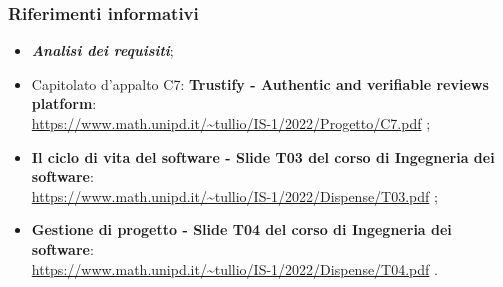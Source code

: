 \subsubsection{Riferimenti informativi}
\begin{itemize}
    \item \textbf{\textit{Analisi dei requisiti}};
    \item Capitolato d'appalto C7: \textbf{Trustify - Authentic and verifiable reviews platform}: \\
          \url{https://www.math.unipd.it/~tullio/IS-1/2022/Progetto/C7.pdf} \hfill{};
    \item \textbf{Il ciclo di vita del software - Slide T03 del corso di Ingegneria dei software}: \\
          \url{https://www.math.unipd.it/~tullio/IS-1/2022/Dispense/T03.pdf} \hfill{};
    \item \textbf{Gestione di progetto - Slide T04 del corso di Ingegneria dei software}: \\
          \url{https://www.math.unipd.it/~tullio/IS-1/2022/Dispense/T04.pdf} \hfill{}.
\end{itemize}
